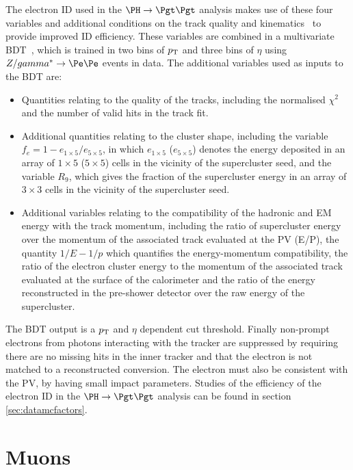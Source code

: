The electron ID used in the $\PH \to \Pgt\Pgt$ analysis makes use of these four variables and additional
conditions on the track quality and kinematics~\cite{Baffioni:2006cd} to provide
improved ID efficiency. These variables are combined in a
multivariate \ac{BDT}~\cite{TMVA}, which is trained in two bins of
$p_{\mathrm{T}}$ and three bins of $\eta$ using $Z/\gamma^{*} \to \Pe\Pe$ events in
data.
The additional variables used as inputs to the \ac{BDT} are:

\begin{itemize}
\item Quantities relating to the quality of the tracks, including the normalised
$\chi^{2}$ and the number of valid hits in the track fit.
\item Additional quantities relating to the cluster shape, including the
variable $f_{e}=1-e_{1\times5}/e_{5\times5}$, in which $e_{1\times5}$
($e_{5\times5}$) denotes the energy deposited in an array of $1 \times 5$ ($5
\times 5$) cells in the vicinity of the supercluster seed, and the variable
$R_{9}$, which gives the fraction of the supercluster energy in an array of
$3\times3$ cells in the vicinity of the supercluster seed.  
\item Additional variables relating to the compatibility of the hadronic and EM
energy with the track momentum, including the ratio of supercluster energy over
the momentum of the associated track evaluated at the \ac{PV} (E/P), the
quantity $1/E-1/p$ which quantifies the energy-momentum compatibility, the ratio
of the electron cluster energy to the momentum of the associated track evaluated
at the surface of the calorimeter and the ratio of the energy reconstructed in
the pre-shower detector over the raw energy of the supercluster.  
\end{itemize}

The \ac{BDT} output is a $p_{\mathrm{T}}$ and $\eta$ dependent cut threshold. Finally
non-prompt electrons from photons interacting with the tracker are suppressed
by requiring there are no missing hits in the inner tracker and that the
electron is not matched to a reconstructed conversion. The electron must also be
consistent with the \ac{PV}, by having small impact parameters. Studies
of the efficiency of the electron ID in the $\PH \to \Pgt\Pgt$ analysis can be
found in section \ref{sec:datamcfactors}.

\section{Muons}
\label{sec:muons}

